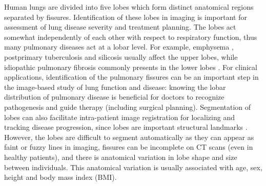 \documentclass[]{spie}  %
\begin{document}
Human lungs are divided into five lobes which form distinct anatomical regions separated by fissures. Identification of these lobes in imaging is important for assessment of lung disease severity and treatment planning. The lobes act somewhat independently of each other with respect to respiratory function, thus many pulmonary diseases act at a lobar level\cite{ukil2009anatomy}. For example, emphysema \cite{jeffery1998structural}, postprimary tuberculosis \cite{leung1999pulmonary} and silicosis \cite{rees2007silica} usually affect the upper lobes, while idiopathic pulmonary fibrosis commonly presents in the lower lobes \cite{lin2015combined}. For clinical applications, identification of the pulmonary fissures can be an important step in the image-based study of lung function and disease: knowing the lobar distribution of pulmonary disease is beneficial for doctors to recognize pathogenesis and guide therapy (including surgical planning)\cite{van2010automatic}. Segmentation of lobes can also facilitate intra-patient image registration for localizing and tracking disease progression, since lobes are important structural landmarks \cite{lassen2011interactive}. However, the lobes are difficult to segment automatically as they can appear as faint or fuzzy lines in imaging, fissures can be incomplete on CT scans (even in healthy patients), and there is anatomical variation in lobe shape and size between individuals. This anatomical variation is usually associated with age, sex, height and body mass index (BMI)\cite{ross2010automatic, gulsun2006variability}. 
\end{document}
